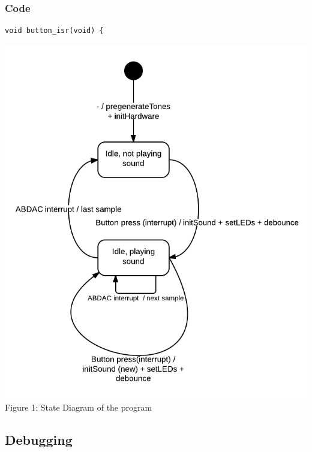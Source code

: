 \documentclass[a4paper,11pt]{article}
\begin{document}
\subsubsection{Code}
\begin{lstlisting}
void button_isr(void) {
\end{lstlisting}

\begin{center}
\centering
\includegraphics[scale=0.75]{images/lucid_chart.png}
\linebreak
Figure 1: State Diagram of the program
\end{center}

\newpage

\subsection*{Debugging}

\end{document}
